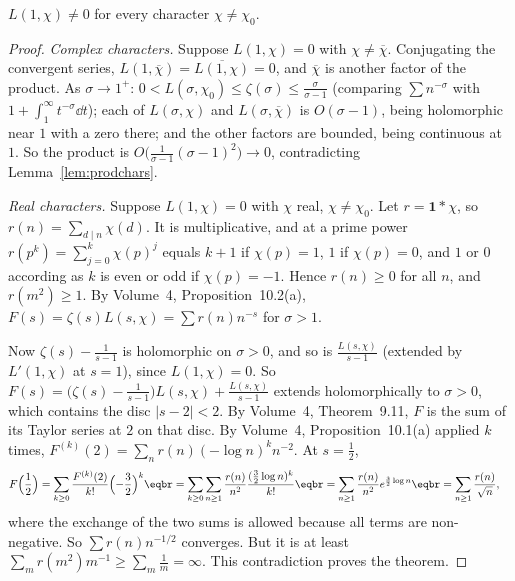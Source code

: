 \begin{theorem}[Dirichlet, 1837]\label{thm:lnonzero}
$L(1,\chi)\ne0$ for every character $\chi\ne\chi_0$.
\end{theorem}
\begin{proof}
\emph{Complex characters.} Suppose $L(1,\chi)=0$ with $\chi\ne\overline\chi$. Conjugating the convergent series, $L(1,\overline\chi)=\overline{L(1,\chi)}=0$, and $\overline\chi$ is
another factor of the product. As $\sigma\to1^+$: $0<L(\sigma,\chi_0)\le\zeta(\sigma)\le\frac\sigma{\sigma-1}$ (comparing $\sum n^{-\sigma}$ with $1+\int_1^\infty t^{-\sigma}\dd t$); each of
$L(\sigma,\chi)$ and $L(\sigma,\overline\chi)$ is $O(\sigma-1)$, being holomorphic near $1$ with a zero there; and the other factors are bounded, being continuous
at $1$. So the product is $O\bigl(\frac1{\sigma-1}(\sigma-1)^2\bigr)\to0$, contradicting Lemma~\ref{lem:prodchars}.

\emph{Real characters.} Suppose $L(1,\chi)=0$ with $\chi$ real, $\chi\ne\chi_0$. Let $r=\mathbf1*\chi$, so $r(n)=\sum_{d\mid n}\chi(d)$. It is multiplicative, and at a
prime power $r(p^k)=\sum_{j=0}^k\chi(p)^j$ equals $k+1$ if $\chi(p)=1$, $1$ if $\chi(p)=0$, and $1$ or $0$ according as $k$ is even or odd if $\chi(p)=-1$.
Hence $r(n)\ge0$ for all $n$, and $r(m^2)\ge1$. By Volume~4, Proposition~10.2(a), $F(s)=\zeta(s)L(s,\chi)=\sum r(n)n^{-s}$ for $\sigma>1$.

Now $\zeta(s)-\frac1{s-1}$ is holomorphic on $\sigma>0$, and so is $\frac{L(s,\chi)}{s-1}$ (extended by $L'(1,\chi)$ at $s=1$), since $L(1,\chi)=0$. So
$F(s)=\bigl(\zeta(s)-\frac1{s-1}\bigr)L(s,\chi)+\frac{L(s,\chi)}{s-1}$ extends holomorphically to $\sigma>0$, which contains the disc $|s-2|<2$. By Volume~4,
Theorem~9.11, $F$ is the sum of its Taylor series at $2$ on that disc. By Volume~4, Proposition~10.1(a) applied $k$ times, $F^{(k)}(2)=\sum_nr(n)(-\log n)^kn^{-2}$. At $s=\frac12$,
\[
\begin{aligned}F\Bigl(\frac12\Bigr)&=\sum_{k\ge0}\frac{F^{(k)}(2)}{k!}\Bigl(-\frac32\Bigr)^k\eqbr=\sum_{k\ge0}\sum_{n\ge1}\frac{r(n)}{n^2}\frac{(\frac32\log n)^k}{k!}\eqbr=\sum_{n\ge1}\frac{r(n)}{n^2}e^{\frac32\log n}\eqbr=\sum_{n\ge1}\frac{r(n)}{\sqrt n},\end{aligned}
\]
where the exchange of the two sums is allowed because all terms are non-negative. So $\sum r(n)n^{-1/2}$ converges. But it is at least
$\sum_mr(m^2)m^{-1}\ge\sum_m\frac1m=\infty$. This contradiction proves the theorem.
\end{proof}

